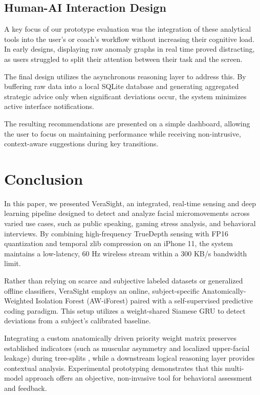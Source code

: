 \documentclass[sigconf]{acmart}
\begin{document}
\subsection{Human-AI Interaction Design}
A key focus of our prototype evaluation was the integration of these analytical tools into the user's or coach's workflow without increasing their cognitive load. In early designs, displaying raw anomaly graphs in real time proved distracting, as users struggled to split their attention between their task and the screen.

The final design utilizes the asynchronous reasoning layer to address this. By buffering raw data into a local SQLite database and generating aggregated strategic advice only when significant deviations occur, the system minimizes active interface notifications. 

The resulting recommendations are presented on a simple dashboard, allowing the user to focus on maintaining performance while receiving non-intrusive, context-aware suggestions during key transitions.

\section{Conclusion}

In this paper, we presented VeraSight, an integrated, real-time sensing and deep learning pipeline designed to detect and analyze facial micromovements across varied use cases, such as public speaking, gaming stress analysis, and behavioral interviews. By combining high-frequency TrueDepth sensing with FP16 quantization and temporal zlib compression on an iPhone 11, the system maintains a low-latency, 60 Hz wireless stream within a 300 KB/s bandwidth limit. 

Rather than relying on scarce and subjective labeled datasets or generalized offline classifiers, VeraSight employs an online, subject-specific Anatomically-Weighted Isolation Forest (AW-iForest) paired with a self-supervised predictive coding paradigm. This setup utilizes a weight-shared Siamese GRU to detect deviations from a subject's calibrated baseline. 

Integrating a custom anatomically driven priority weight matrix preserves established indicators (such as muscular asymmetry and localized upper-facial leakage) during tree-splits \cite{porter2012secrets, vitale2021facial}, while a downstream logical reasoning layer provides contextual analysis. Experimental prototyping demonstrates that this multi-model approach offers an objective, non-invasive tool for behavioral assessment and feedback.
\end{document}
